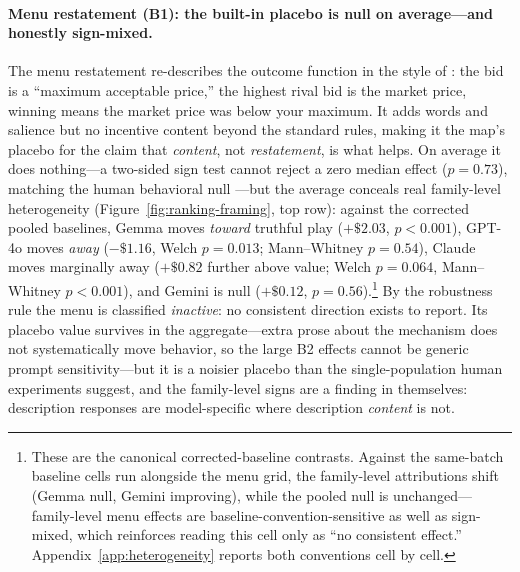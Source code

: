 \paragraph{Menu restatement (B1): the built-in placebo is null on average---and honestly sign-mixed.}
The menu restatement re-describes the outcome function in the style of \citet{gonczarowski2023strategyproofness}: the bid is a ``maximum acceptable price,'' the highest rival bid is the market price, winning means the market price was below your maximum. It adds words and salience but no incentive content beyond the standard rules, making it the map's placebo for the claim that \emph{content}, not \emph{restatement}, is what helps. On average it does nothing---a two-sided sign test cannot reject a zero median effect ($p=0.73$), matching the human behavioral null \citep{gonczarowski2023strategyproofness}---but the average conceals real family-level heterogeneity (Figure~\ref{fig:ranking-framing}, top row): against the corrected pooled baselines, Gemma moves \emph{toward} truthful play ($+\$2.03$, $p<0.001$), GPT-4o moves \emph{away} ($-\$1.16$, Welch $p=0.013$; Mann--Whitney $p=0.54$), Claude moves marginally away ($+\$0.82$ further above value; Welch $p=0.064$, Mann--Whitney $p<0.001$), and Gemini is null ($+\$0.12$, $p=0.56$).\footnote{These are the canonical corrected-baseline contrasts. Against the same-batch baseline cells run alongside the menu grid, the family-level attributions shift (Gemma null, Gemini improving), while the pooled null is unchanged---family-level menu effects are baseline-convention-sensitive as well as sign-mixed, which reinforces reading this cell only as ``no consistent effect.'' Appendix~\ref{app:heterogeneity} reports both conventions cell by cell.} By the robustness rule the menu is classified \emph{inactive}: no consistent direction exists to report. Its placebo value survives in the aggregate---extra prose about the mechanism does not systematically move behavior, so the large B2 effects cannot be generic prompt sensitivity---but it is a noisier placebo than the single-population human experiments suggest, and the family-level signs are a finding in themselves: description responses are model-specific where description \emph{content} is not.

